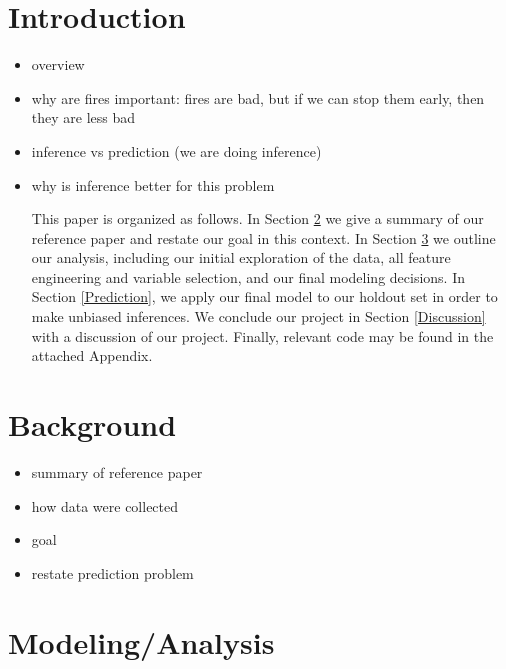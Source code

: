 \documentclass{article}
\begin{document}
\begin{abstract}

\end{abstract}

\section{Introduction}

\begin{itemize}

\item overview
\item why are fires important: fires are bad, but if we can stop them early, then they are less bad
\item inference vs prediction (we are doing inference)
\item why is inference better for this problem



This paper is organized as follows. In Section \ref{Background} we give a summary of our reference paper and restate our goal in this context. In Section \ref{Analysis} we outline our analysis, including our initial exploration of the data, all feature engineering and variable selection, and our final modeling decisions. In Section \ref{Prediction}, we apply our final model to our holdout set in order to make unbiased inferences. We conclude our project in Section \ref{Discussion} with a discussion of our project. Finally, relevant code may be found in the attached Appendix.

\end{itemize}

\section{Background}\label{Background}

\begin{itemize}

\item summary of reference paper
\item how data were collected
\item goal
\item restate prediction problem

\end{itemize}

\section{Modeling/Analysis}\label{Analysis}
\end{document}
